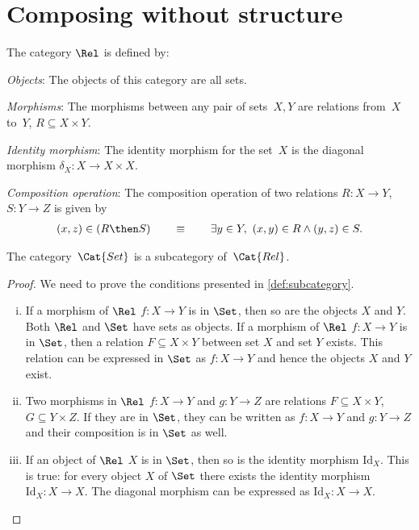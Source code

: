\section{Composing without structure}
\begin{definition}
    The category $\Rel$ is defined by:
    \begin{compactenum}
    \item \emph{Objects}: The objects of this category are all sets.
    \item \emph{Morphisms}: The morphisms between any pair of sets~$X, Y$
    are relations from~$X$ to~$Y$, $R\subseteq X\times Y$.
    \item \emph{Identity morphism}: The identity morphism for the set~$X$
    is the diagonal morphism $\delta_X \colon X\to X\times X$.
    \item \emph{Composition operation}: The composition operation of two relations $R \colon X\to Y$, $S\colon Y\to Z$ is given by
    \begin{align}
    (x,z) \in (R \then S) \qquad \equiv \qquad  \exists y \in Y, \ (x,y) \in R \wedge (y,z) \in S.  	
    \end{align}
    \end{compactenum}
\end{definition}

\begin{lemma}
    The category~$\Cat{Set}$ is a subcategory of~$\Cat{Rel}$.
\end{lemma}
\begin{proof}
	We need to prove the conditions presented in \cref{def:subcategory}.
	\begin{enumerate}[(i)]
	\item If a morphism of $\Rel$ $f \colon X\to Y$ is in $\Set$, then so are the objects $X$ and $Y$. Both $\Rel$ and $\Set$ have sets as objects. If a morphism of $\Rel$ $f\colon X\to Y$ is in $\Set$, then a relation $F\subseteq X\times Y$ between set $X$ and set $Y$ exists. This relation can be expressed in $\Set$ as $f\colon X\to Y$ and hence the objects $X$ and $Y$ exist.
	\item Two morphisms in $\Rel$ $f\colon X\to Y$ and $g\colon Y\to Z$ are relations $F\subseteq X\times Y$, $G\subseteq Y\times Z$. If they are in $\Set$, they can be written as $f\colon X\to Y$ and $g\colon Y\to Z$ and their composition is in $\Set$ as well. 
	\item If an object of $\Rel$ $X$ is in $\Set$, then so is the identity morphism $\text{Id}_X$. This is true: for every object $X$ of $\Set$ there exists the identity morphism $\text{Id}_X:X\to X$. The diagonal morphism can be expressed as $\text{Id}_X:X\to X$.
	\end{enumerate}
\end{proof}
